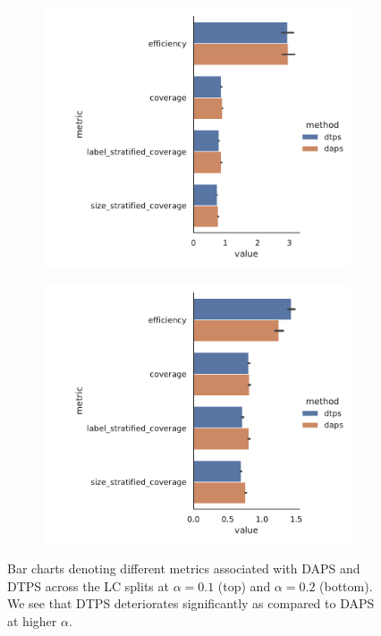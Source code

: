 \begin{figure}
    \centering
    \begin{subfigure}{0.7\linewidth}
        \includegraphics[width=\linewidth,alt={Bar charts denoting different metrics associated with DAPS and DTPS across the LC split at $\alpha=0.1$}]{graphConformal/figures/nspc/daps_dtps_0.1}
    \end{subfigure}
    \begin{subfigure}{0.7\linewidth}
        \includegraphics[width=\linewidth,alt={Bar charts denoting different metrics associated with DAPS and DTPS across the LC split at $\alpha=0.2$}]{graphConformal/figures/nspc/daps_dtps_0.2}
    \end{subfigure}
    \caption{Bar charts denoting different metrics associated with DAPS and DTPS across the LC splits at $\alpha=0.1$ (top) and $\alpha=0.2$ (bottom). We see that DTPS deteriorates significantly as compared to DAPS at higher $\alpha$.}
    \label{fig:nspc:conformal:daps_vs_dtps}
\end{figure}

